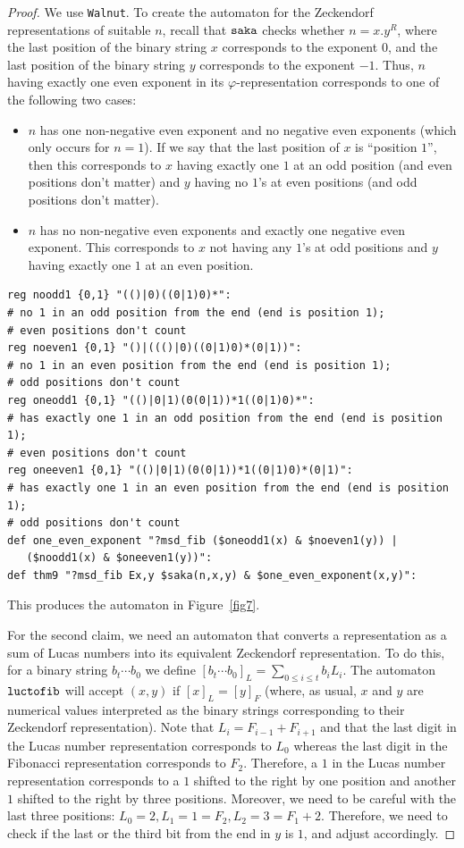 \documentclass[10pt,a4paper]{amsart}
\begin{document}
\begin{proof}
We use {\tt Walnut}. 
To create the automaton for the Zeckendorf representations of suitable $n$, recall that ${\tt saka}$ checks whether $n = x.y^R$, where the last position of the binary string $x$ corresponds to the exponent $0$, and the last position of the binary string $y$ corresponds to the exponent $-1$. 
Thus, $n$ having exactly one even exponent in its $\varphi$-representation corresponds to one of the following two cases:
\begin{itemize}
	\item $n$ has one non-negative even exponent and no negative even exponents (which only occurs for $n = 1$). If we say that the last position of $x$ is ``position $1$'', then this corresponds to $x$ having exactly one $1$ at an odd position (and even positions don't matter) and $y$ having no $1$'s at even positions (and odd positions don't matter).
	\item $n$ has no non-negative even exponents and exactly one negative even exponent. This corresponds to $x$ not having any $1$'s at odd positions and $y$ having exactly one $1$ at an even position.
\end{itemize}


\begin{verbatim}
reg noodd1 {0,1} "(()|0)((0|1)0)*":
# no 1 in an odd position from the end (end is position 1); 
# even positions don't count
reg noeven1 {0,1} "()|((()|0)((0|1)0)*(0|1))":
# no 1 in an even position from the end (end is position 1); 
# odd positions don't count
reg oneodd1 {0,1} "(()|0|1)(0(0|1))*1((0|1)0)*":
# has exactly one 1 in an odd position from the end (end is position 1); 
# even positions don't count
reg oneeven1 {0,1} "(()|0|1)(0(0|1))*1((0|1)0)*(0|1)":
# has exactly one 1 in an even position from the end (end is position 1); 
# odd positions don't count
def one_even_exponent "?msd_fib ($oneodd1(x) & $noeven1(y)) | 
   ($noodd1(x) & $oneeven1(y))":
def thm9 "?msd_fib Ex,y $saka(n,x,y) & $one_even_exponent(x,y)":
\end{verbatim}
This produces the automaton in
Figure~\ref{fig7}.  

For the second claim, we need an automaton that converts a representation as a sum of Lucas numbers into its equivalent Zeckendorf representation.  To do this, for a binary string
$b_t \cdots b_0$ we define
$[b_t \cdots b_0]_L = \sum_{0 \leq i \leq t} b_i L_i$.
The automaton ${\tt luctofib}$ will accept $(x,y)$ if $[x]_L = [y]_F$ (where, as usual, $x$ and $y$ are numerical values interpreted as the binary strings corresponding to their Zeckendorf representation). 
Note that $L_i = F_{i-1} + F_{i+1}$ and 
that the last digit in the Lucas number representation corresponds to $L_0$ whereas the last digit in the Fibonacci representation corresponds to $F_2$.
Therefore, a $1$ in the Lucas number representation corresponds to a $1$ shifted to the right by one position and another $1$ shifted to the right by three positions. 
Moreover, we need to be careful with the last three positions: $L_0 = 2, L_1 = 1 = F_2, L_2 = 3 = F_1 + 2$. 
Therefore, we need to check if the last or the third bit from the end in $y$ is $1$, and adjust accordingly.



\end{proof}
\end{document}
